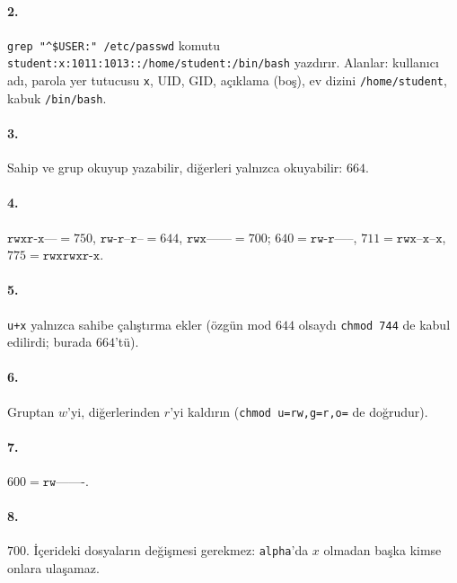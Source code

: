 \documentclass[11pt,a4paper]{article}
\newcommand{\cmd}[1]{\texttt{#1}}
\begin{document}
\paragraph{2.} \cmd{grep "\^{}\$USER:" /etc/passwd} komutu\\ \texttt{student:x:1011:1013::/home/student:/bin/bash} yazdırır. Alanlar: kullanıcı adı, parola yer tutucusu \texttt{x}, UID, GID, açıklama (boş), ev dizini \texttt{/home/student}, kabuk \texttt{/bin/bash}.

\paragraph{3.} Sahip ve grup okuyup yazabilir, diğerleri yalnızca okuyabilir: $664$.


\paragraph{4.} $\texttt{rwxr-x---} = 750$, $\texttt{rw-r--r--} = 644$, $\texttt{rwx------} = 700$; $640 = \texttt{rw-r-----}$, $711 = \texttt{rwx--x--x}$, $775 = \texttt{rwxrwxr-x}$.

\paragraph{5.} \texttt{u+x} yalnızca sahibe çalıştırma ekler (özgün mod $644$ olsaydı \texttt{chmod 744} de kabul edilirdi; burada $664$'tü).


\paragraph{6.} Gruptan $w$'yi, diğerlerinden $r$'yi kaldırın (\texttt{chmod u=rw,g=r,o=} de doğrudur).


\paragraph{7.} $600 = \texttt{rw-------}$.


\paragraph{8.} $700$. İçerideki dosyaların değişmesi gerekmez: \texttt{alpha}'da $x$ olmadan başka kimse onlara ulaşamaz.

\end{document}
